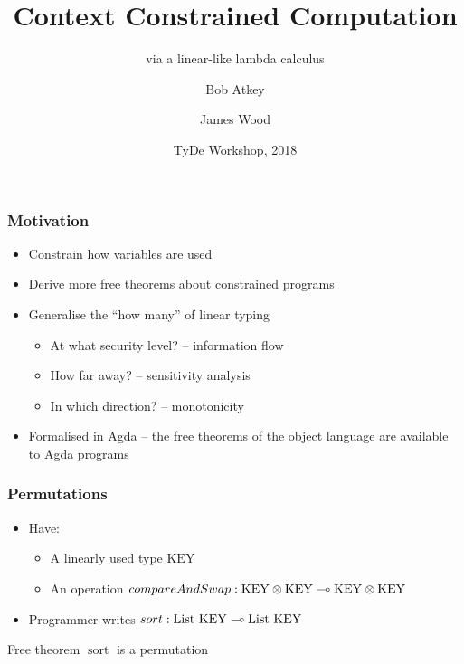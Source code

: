 \documentclass{beamer}
\title{Context Constrained Computation}
\subtitle{via a linear-like lambda calculus}
\author{Bob Atkey\inst{1} \and James Wood\inst{1}}
\institute{\inst{1}University of Strathclyde}
\date{TyDe Workshop, 2018}
\begin{document}
  \frame{\titlepage}
  \begin{frame}
    \frametitle{Motivation}

    \begin{itemize}
    \item Constrain how variables are used \pause
    \item Derive more free theorems about constrained programs \pause
    \item Generalise the ``how many'' of linear typing \pause
      \begin{itemize}
      \item At what security level? -- information flow \pause
      \item How far away? -- sensitivity analysis \pause
      \item In which direction? -- monotonicity \pause
      \end{itemize}
    \item Formalised in Agda -- the free theorems of the object language are
      available to Agda programs
    \end{itemize}
  \end{frame}
  \begin{frame}
    \frametitle{Permutations}
    \newcommand{\KEY}{\mathrm{KEY}}
    \begin{itemize}
    \item Have: \pause
      \begin{itemize}
      \item A linearly used type $\KEY$ \pause
      \item An operation $\mathop{compareAndSwap} : \fun{\tensor{\KEY}{\KEY}}{\tensor{\KEY}{\KEY}}$ \pause
      \end{itemize}
    \item Programmer writes $\mathop{sort} : \fun{\mathrm{List}~\KEY}{\mathrm{List}~\KEY}$ \pause
    \end{itemize}
    \begin{block}{Free theorem}
      $\mathop{sort}$ is a permutation
    \end{block}
  \end{frame}
\end{document}
